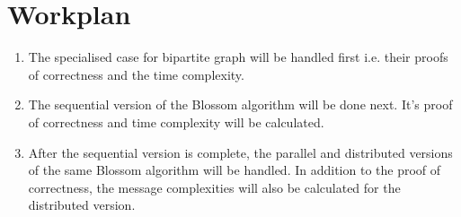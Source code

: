 \documentclass{article}
\begin{document}
\section{Workplan}
\begin{enumerate}
    \item The specialised case for bipartite graph will be handled first i.e. their proofs of correctness and the time complexity.
    \item The sequential version of the Blossom algorithm will be done next. It's proof of correctness and time complexity will be calculated.
    \item After the sequential version is complete, the parallel and distributed versions of the same Blossom algorithm will be handled. In addition to the proof of correctness, the message complexities will also be calculated for the distributed version.
\end{enumerate}
\end{document}
